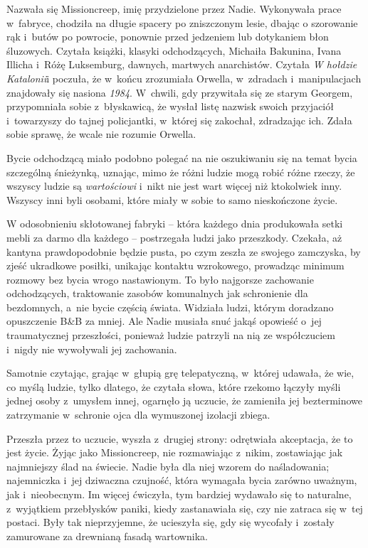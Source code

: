 \documentclass[oneside,polish,11pt,sfheadings]{mwbk}
\begin{document}
Nazwała się Missioncreep, imię przydzielone przez Nadie. Wykonywała
prace w~fabryce, chodziła na długie spacery po zniszczonym lesie, dbając
o szorowanie rąk i~butów po powrocie, ponownie przed jedzeniem lub
dotykaniem błon śluzowych. Czytała książki, klasyki odchodzących,
Michaiła Bakunina, Ivana Illicha i~Różę Luksemburg, dawnych, martwych
anarchistów. Czytała \textit{W hołdzie Katalonii}i poczuła, że w~końcu
zrozumiała Orwella, w~zdradach i~manipulacjach znajdowały się nasiona
\textit{1984}. W~chwili, gdy przywitała się ze starym Georgem,
przypomniała sobie z~błyskawicą, że wysłał listę nazwisk swoich
przyjaciół i~towarzyszy do tajnej policjantki, w~której się zakochał,
zdradzając ich. Zdała sobie sprawę, że wcale nie rozumie Orwella.

Bycie odchodzącą miało podobno polegać na nie oszukiwaniu się na temat
bycia szczególną śnieżynką, uznając, mimo że różni ludzie mogą robić
różne rzeczy, że wszyscy ludzie są \textit{wartościowi} i~nikt nie jest
wart więcej niż ktokolwiek inny. Wszyscy inni byli osobami, które miały
w sobie to samo nieskończone życie.

W odosobnieniu skłotowanej fabryki -- która każdego dnia produkowała
setki mebli za darmo dla każdego -- postrzegała ludzi jako przeszkody.
Czekała, aż kantyna prawdopodobnie będzie pusta, po czym zeszła ze
swojego zamczyska, by zjeść ukradkowe posiłki, unikając kontaktu
wzrokowego, prowadząc minimum rozmowy bez bycia wrogo nastawionym. To
było najgorsze zachowanie odchodzących, traktowanie zasobów komunalnych
jak schronienie dla bezdomnych, a~nie bycie częścią świata. Widziała
ludzi, którym doradzano opuszczenie B\&B za mniej. Ale Nadie musiała
snuć jakąś opowieść o~jej traumatycznej przeszłości, ponieważ ludzie
patrzyli na nią ze współczuciem i~nigdy nie wywoływali jej zachowania.

Samotnie czytając, grając w~głupią grę telepatyczną, w~której udawała,
że wie, co myślą ludzie, tylko dlatego, że czytała słowa, które rzekomo
łączyły myśli jednej osoby z~umysłem innej, ogarnęło ją uczucie, że
zamieniła jej bezterminowe zatrzymanie w~schronie ojca dla wymuszonej
izolacji zbiega.

Przeszła przez to uczucie, wyszła z~drugiej strony: odrętwiała
akceptacja, że to jest życie. Żyjąc jako Missioncreep, nie rozmawiając z~nikim, zostawiając jak najmniejszy ślad na świecie. Nadie była dla niej
wzorem do naśladowania; najemniczka i~jej dziwaczna czujność, która
wymagała bycia zarówno uważnym, jak i~nieobecnym. Im więcej ćwiczyła,
tym bardziej wydawało się to naturalne, z~wyjątkiem przebłysków paniki,
kiedy zastanawiała się, czy nie zatraca się w~tej postaci. Były tak
nieprzyjemne, że ucieszyła się, gdy się wycofały i~zostały zamurowane za
drewnianą fasadą wartownika.
\end{document}
